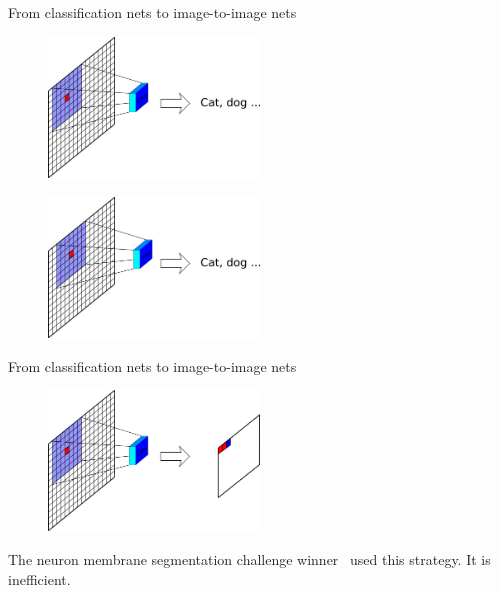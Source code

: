 \documentclass[xcolor=pdftex,dvipsnames,table,mathserif]{beamer}
\begin{document}
\begin{frame}{From classification nets to image-to-image nets}

      \begin{figure}
      \includegraphics[width=0.5\textwidth]{image_transf1.png}
      \end{figure}

      \pause

      \begin{figure}
      \includegraphics[width=0.5\textwidth]{image_transf2.png}
      \end{figure}

\end{frame}

\begin{frame}{From classification nets to image-to-image nets}

      \begin{figure}
      \includegraphics[width=0.5\textwidth]{image_transf_fin.png}
      \end{figure}

      The neuron membrane segmentation challenge winner~\cite{ciresan_deep_2012} used this strategy. It is inefficient.



\end{frame}
\end{document}
